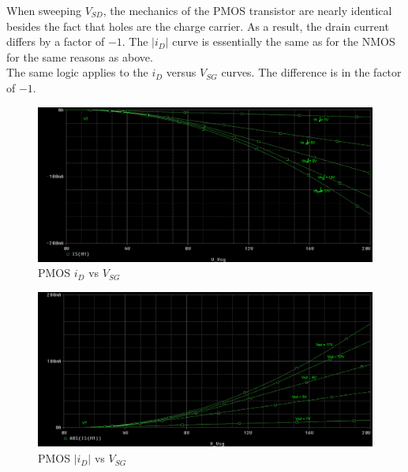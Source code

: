 
When sweeping $V_{SD}$, the mechanics of the PMOS transistor are nearly identical besides the fact that holes are the charge carrier. As a result, the drain current differs by a factor of $-1$. The $|i_D|$ curve is essentially the same as for the NMOS for the same reasons as above. \\

The same logic applies to the $i_{D}$ versus $V_{SG}$ curves. The difference is in the factor of $-1$.

\FloatBarrier

\begin{figure}[h!]
	\centering
	\includegraphics[scale=0.25]{./images/id_vs_vsg.PNG}
	\caption{PMOS $i_D$ vs $V_{SG}$}
	\label{fig:id_vs_vsg}
\end{figure}

\FloatBarrier

\FloatBarrier

\begin{figure}[h!]
	\centering
	\includegraphics[scale=0.5]{./images/id_vs_vsg_abs.PNG}
	\caption{PMOS $|i_D|$ vs $V_{SG}$}
	\label{fig:id_vs_vsg_abs}
\end{figure}

\FloatBarrier
